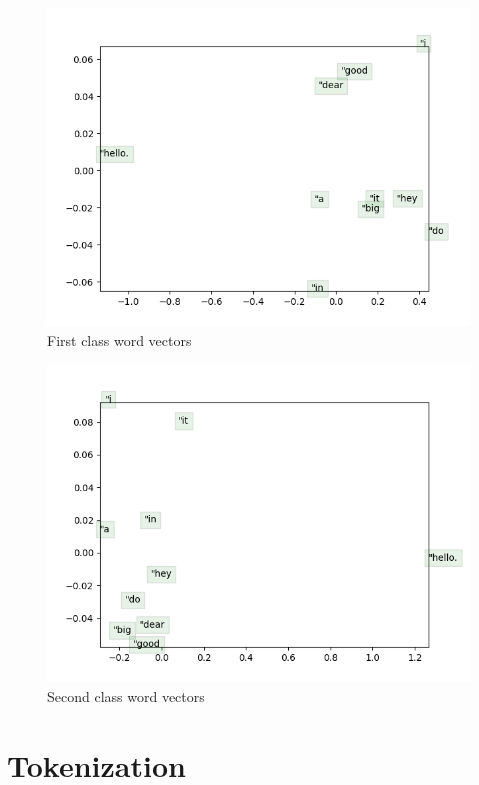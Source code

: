 \documentclass[11pt]{article}
\begin{document}
\begin{figure}[H]
    \centering
    \includegraphics[scale=0.65]{reports/word_vectors_michael.png}
    \caption{First class word vectors}
    \label{fig:michael_word2vec}
\end{figure}

\begin{figure}[H]
    \centering
    \includegraphics[scale=0.65]{reports/word_vectors_dwight.png}
    \caption{Second class word vectors}
    \label{fig:dwight_word2vec}
\end{figure}

\section{Tokenization}
\end{document}
